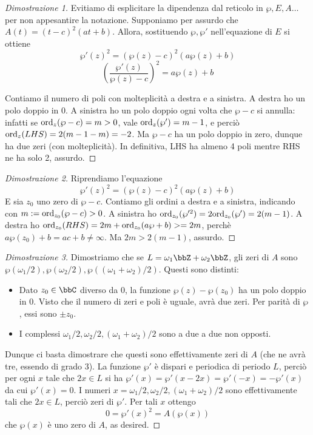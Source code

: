 \begin{proof}[Dimostrazione 1]
Evitiamo di esplicitare la dipendenza dal reticolo in $\wp, E,A \dots$ per non appesantire la notazione. Supponiamo per assurdo che $A(t) = (t-c)^2(at+b)$. Allora, sostituendo $\wp, \wp'$ nell'equazione di $E$ si ottiene
$$\wp'(z)^2 = (\wp(z) - c)^2(a\wp(z)+b) $$
$$ \left ( \frac{\wp'(z)}{\wp(z)-c} \right )^2 = a\wp(z)+b $$

Contiamo il numero di poli con molteplicità a destra e a sinistra. A destra ho un polo doppio in $0$. A sinistra ho un polo doppio ogni volta che $\wp - c$ si annulla: infatti se $\text{ord}_{z}(\wp -c) = m > 0$, vale $\text{ord}_{z}(\wp') = m-1$, e perciò $\text{ord}_{z}(LHS) = 2(m-1-m) = -2$. Ma $\wp-c$ ha un polo doppio in zero, dunque ha due zeri (con molteplicità). In definitiva, LHS ha almeno 4 poli mentre RHS ne ha solo 2, assurdo.
\end{proof}

\begin{proof}[Dimostrazione 2]
Riprendiamo l'equazione
$$\wp'(z)^2 = (\wp(z) - c)^2(a\wp(z)+b) $$
E sia $z_0$ uno zero di $\wp-c$. Contiamo gli ordini a destra e a sinistra, indicando con $m:=\text{ord}_{z_0}(\wp-c) > 0$.
A sinistra ho $\text{ord}_{z_0}( \wp'^2) = 2\text{ord}_{z_0}( \wp') = 2(m-1)$. A destra ho $\text{ord}_{z_0}(RHS) = 2m + \text{ord}_{z_0}(a\wp+b) >= 2m$, perchè $a \wp(z_0)+b = ac+b \neq \infty$. Ma $2m> 2(m-1)$, assurdo.
\end{proof}

\begin{proof}[Dimostrazione 3]
Dimostriamo che se $L=\omega_1\bbZ + \omega_2 \bbZ$, gli zeri di $A$ sono $ \wp(\omega_1/2), \wp(\omega_2/2), \wp((\omega_1+\omega_2)/2)$. Questi sono distinti:
\begin{itemize}
\item Dato $z_0 \in \bbC$ diverso da 0, la funzione $\wp(z) - \wp(z_0)$ ha un polo doppio in 0. Visto che il numero di zeri e poli è uguale, avrà due zeri. Per parità di $\wp$, essi sono $\pm z_0$.
\item I complessi $\omega_1/2, \omega_2/2, (\omega_1+\omega_2)/2$ sono a due a due non opposti.
\end{itemize}
Dunque ci basta dimostrare che questi sono effettivamente zeri di $A$ (che ne avrà tre, essendo di grado 3). La funzione $\wp'$ è dispari e periodica di periodo $L$, perciò per ogni $x$ tale che $2x \in L$ si ha
$\wp'(x) = \wp'(x-2x) = \wp'(-x) = -\wp'(x)$
da cui $\wp'(x) = 0$. I numeri $x=\omega_1/2, \omega_2/2, (\omega_1+\omega_2)/2$ sono effettivamente tali che $2x \in L$, perciò zeri di $\wp'$. Per tali $x$ ottengo
$$ 0 = \wp'(x)^2 = A(\wp(x))$$
che $\wp(x)$ è uno zero di $A$, as desired.
\end{proof}


